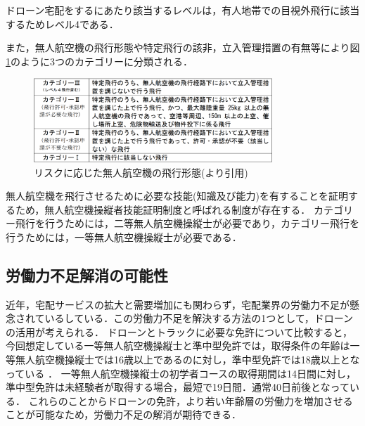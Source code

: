\documentclass[a4paper, titlepage]{jsarticle}
\begin{document}
ドローン宅配をするにあたり該当するレベルは，有人地帯での目視外飛行に該当するためレベル4である．

また，無人航空機の飛行形態や特定飛行の該非，立入管理措置の有無等により図\ref{fig:dron_category}のように3つのカテゴリーに分類される．
\begin{figure}[htbp]
  \centering
  \includegraphics[width=0.8\textwidth]{dron_category.pdf}
  \caption{リスクに応じた無人航空機の飛行形態(\cite{delivery_guidelines_2023}より引用)}
  \label{fig:dron_category}
\end{figure}

無人航空機を飛行させるために必要な技能(知識及び能力)を有することを証明するため，無人航空機操縦者技能証明制度と呼ばれる制度が存在する．
カテゴリー飛行を行うためには，二等無人航空機操縦士が必要であり，カテゴリー飛行を行うためには，一等無人航空機操縦士が必要である\cite{delivery_guidelines_2023}．

\subsection{労働力不足解消の可能性}
近年，宅配サービスの拡大と需要増加にも関わらず，宅配業界の労働力不足が懸念されているしている．この労働力不足を解決する方法の1つとして，ドローンの活用が考えられる．
ドローンとトラックに必要な免許について比較すると，今回想定している一等無人航空機操縦士と準中型免許では，取得条件の年齢は一等無人航空機操縦士では16歳以上であるのに対し，準中型免許では18歳以上となっている\cite{nipponkaiji_shikaku} \cite{truckingAssociation}．
一等無人航空機操縦士の初学者コースの取得期間は14日間\cite{kddi_drone_academy}に対し，準中型免許は未経験者が取得する場合，最短で19日間．通常40日前後\cite{kochi_track}となっている．
これらのことからドローンの免許，より若い年齢層の労働力を増加させることが可能なため，労働力不足の解消が期待できる．
\end{document}
